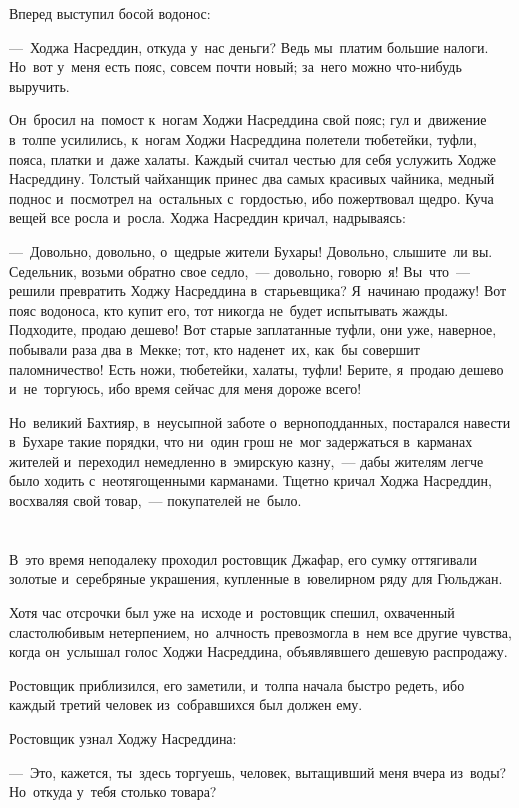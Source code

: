 \documentclass[12pt,a4paper]{book}
\begin{document}
Вперед выступил босой водонос:

—~Ходжа Насреддин, откуда у~нас деньги? Ведь мы~платим большие налоги. Но~вот у~меня есть пояс, совсем почти новый; за~него можно что-нибудь выручить.

Он~бросил на~помост к~ногам Ходжи Насреддина свой пояс; гул и~движение в~толпе усилились, к~ногам Ходжи Насреддина полетели тюбетейки, туфли, пояса, платки и~даже халаты. Каждый считал честью для себя услужить Ходже Насреддину. Толстый чайханщик принес два самых красивых чайника, медный поднос и~посмотрел на~остальных с~гордостью, ибо пожертвовал щедро. Куча вещей все росла и~росла. Ходжа Насреддин кричал, надрываясь:

—~Довольно, довольно, о~щедрые жители Бухары! Довольно, слышите~ли вы. Седельник, возьми обратно свое седло,~— довольно, говорю~я! Вы~что~— решили превратить Ходжу Насреддина в~старьевщика? Я~начинаю продажу! Вот пояс водоноса, кто купит его, тот никогда не~будет испытывать жажды. Подходите, продаю дешево! Вот старые заплатанные туфли, они уже, наверное, побывали раза два в~Мекке; тот, кто наденет~их, как~бы совершит паломничество! Есть ножи, тюбетейки, халаты, туфли! Берите, я~продаю дешево и~не~торгуюсь, ибо время сейчас для меня дороже всего!

Но~великий Бахтияр, в~неусыпной заботе о~верноподданных, постарался навести в~Бухаре такие порядки, что ни~один грош не~мог задержаться в~карманах жителей и~переходил немедленно в~эмирскую казну,~— дабы жителям легче было ходить с~неотягощенными карманами. Тщетно кричал Ходжа Насреддин, восхваляя свой товар,~— покупателей не~было.


\chapter{}

В~это время неподалеку проходил ростовщик Джафар, его сумку оттягивали золотые и~серебряные украшения, купленные в~ювелирном ряду для Гюльджан.

Хотя час отсрочки был уже на~исходе и~ростовщик спешил, охваченный сластолюбивым нетерпением, но~алчность превозмогла в~нем все другие чувства, когда он~услышал голос Ходжи Насреддина, объявлявшего дешевую распродажу.

Ростовщик приблизился, его заметили, и~толпа начала быстро редеть, ибо каждый третий человек из~собравшихся был должен ему.

Ростовщик узнал Ходжу Насреддина:

—~Это, кажется, ты~здесь торгуешь, человек, вытащивший меня вчера из~воды? Но~откуда у~тебя столько товара?
\end{document}
